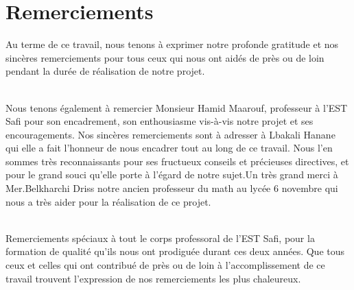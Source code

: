 \documentclass[a4paper]{report}
\begin{document}
\chapter*{Remerciements}
Au terme de ce travail, nous tenons à exprimer notre profonde gratitude et nos sincères remerciements pour tous ceux qui nous ont aidés de près ou de loin pendant la durée de réalisation de notre projet.\\\\
\par Nous tenons également à remercier Monsieur Hamid Maarouf, professeur à l’EST Safi pour son encadrement, son enthousiasme vis-à-vis notre projet et ses encouragements. Nos sincères remerciements sont à adresser à Lbakali Hanane qui elle a fait l’honneur de nous encadrer tout au long de ce travail. Nous l'en sommes très reconnaissants pour ses fructueux conseils et précieuses directives, et pour le grand souci qu’elle porte à l’égard de notre sujet.Un très grand merci à Mer.Belkharchi Driss notre ancien professeur du math au lycée 6 novembre qui nous a très aider pour la réalisation de ce projet.\\\\
\par Remerciements spéciaux à tout le corps professoral de l'EST Safi, pour la formation de qualité qu’ils nous ont prodiguée durant ces deux années. Que tous ceux et celles qui ont contribué de près ou de loin à l’accomplissement de ce travail trouvent l’expression de nos
remerciements les plus chaleureux.
\tableofcontents
\newpage
\listoffigures
\newpage
\listoftables
\end{document}
